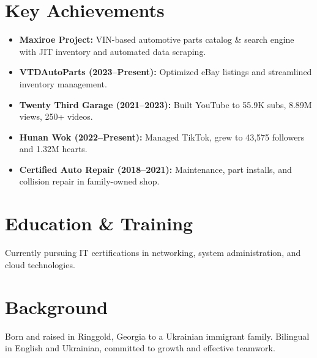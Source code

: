 \documentclass[a4paper,11pt]{article}
\begin{document}
\section*{Key Achievements}
\begin{itemize}[leftmargin=*]
  \item \textbf{Maxiroe Project:} VIN-based automotive parts catalog \& search engine with JIT inventory and automated data scraping.
  \item \textbf{VTDAutoParts (2023–Present):} Optimized eBay listings and streamlined inventory management.
  \item \textbf{Twenty Third Garage (2021–2023):} Built YouTube to 55.9K subs, 8.89M views, 250+ videos.
  \item \textbf{Hunan Wok (2022–Present):} Managed TikTok, grew to 43,575 followers and 1.32M hearts.
  \item \textbf{Certified Auto Repair (2018–2021):} Maintenance, part installs, and collision repair in family-owned shop.
\end{itemize}

\section*{Education \& Training}
Currently pursuing IT certifications in networking, system administration, and cloud technologies.

\section*{Background}
Born and raised in Ringgold, Georgia to a Ukrainian immigrant family. Bilingual in English and Ukrainian, committed to growth and effective teamwork.
\end{document}
